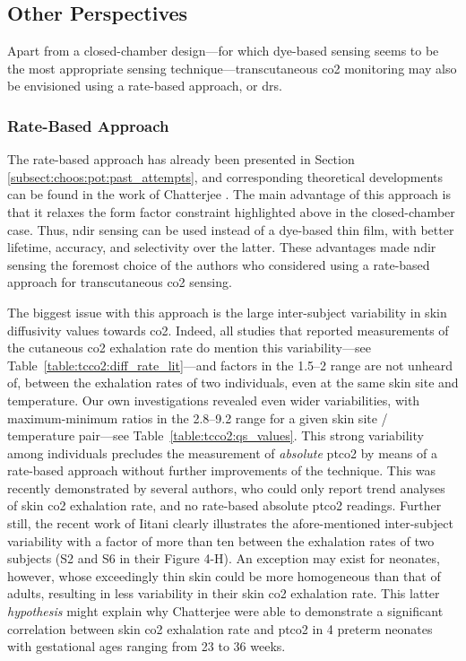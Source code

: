 \subsection{Other Perspectives}

Apart from a closed-chamber design---for which dye-based sensing seems to be the most appropriate sensing technique---transcutaneous \gls{co2} monitoring may also be envisioned using a rate-based approach, or \gls{drs}.

\subsubsection{Rate-Based Approach}\label{subsect:choos:pot:rate_based}

The rate-based approach has already been presented in Section \ref{subsect:choos:pot:past_attempts}, and corresponding theoretical developments can be found in the work of Chatterjee \etal{}\cite{chatterjee2015}. The main advantage of this approach is that it relaxes the form factor constraint highlighted above in the closed-chamber case. Thus, \gls{ndir} sensing can be used instead of a dye-based thin film, with better lifetime, accuracy, and selectivity over the latter. These advantages made \gls{ndir} sensing the foremost choice of the authors who considered using a rate-based approach for transcutaneous \gls{co2} sensing\cite{chatterjee2014, chatterjee2015, ge2018, grangeat2019, grangeat2020}.

The biggest issue with this approach is the large inter-subject variability in skin diffusivity values towards \gls{co2}. Indeed, all studies that reported measurements of the cutaneous \gls{co2} exhalation rate do mention this variability---see Table~\ref{table:tcco2:diff_rate_lit}---and factors in the 1.5--2 range are not unheard of, between the exhalation rates of two individuals, even at the same skin site and temperature. Our own investigations revealed even wider variabilities, with maximum-minimum ratios in the 2.8--9.2 range for a given skin site / temperature pair---see Table~\ref{table:tcco2:qs_values}. This strong variability among individuals precludes the measurement of \emph{absolute} \gls{ptco2} by means of a rate-based approach without further improvements of the technique. This was recently demonstrated by several authors, who could only report trend analyses of skin \gls{co2} exhalation rate, and no rate-based absolute \gls{ptco2} readings\cite{ge2018, grangeat2019, grangeat2020}. Further still, the recent work of Iitani \etal{}\cite{iitani2021} clearly illustrates the afore-mentioned inter-subject variability with a factor of more than ten between the exhalation rates of two subjects (S2 and S6 in their Figure 4-H). An exception may exist for neonates, however, whose exceedingly thin skin could be more homogeneous than that of adults, resulting in less variability in their skin \gls{co2} exhalation rate. This latter \emph{hypothesis} might explain why Chatterjee \etal{}\cite{chatterjee2015} were able to demonstrate a significant correlation between skin \gls{co2} exhalation rate and \gls{ptco2} in 4 preterm neonates with gestational ages ranging from 23 to 36 weeks.

